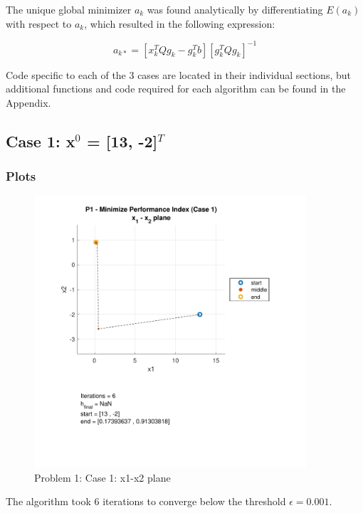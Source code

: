 \documentclass[conf]{new-aiaa}
\begin{document}
The unique global minimizer $a_k$ was found analytically by differentiating $E(a_k)$ with respect to $a_k$, which resulted in the following expression: 

\begin{equation}
	a_{k *} = [x_k^T Q g_k - g_k^T b] [g_k^T Q g_k]^{-1}
\end{equation}

Code specific to each of the 3 cases are located in their individual sections, but additional functions and code required for each algorithm can be found in the Appendix. 


\subsection{Case 1: x$^0$ = [13, -2]$^T$}

\subsubsection{Plots}

\begin{figure}[H]
	\begin{center}
		\includegraphics[width=0.9\textwidth]{P1 - Minimize Performance Index (Case 1) - x_1 - x_2 plane.pdf}
	\end{center}
	\caption{Problem 1: Case 1: x1-x2 plane}
\end{figure}

The algorithm took 6 iterations to converge below the threshold $\epsilon = 0.001$. 
\end{document}
